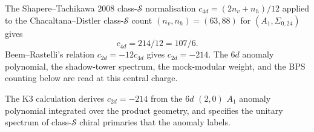 \begin{remark}
\label{rem:anomtop-class-s-central-charge-k3}
The Shapere--Tachikawa 2008 class-$\mathcal S$ normalisation
$c_{4d} = (2n_v + n_h)/12$ applied to the Chacaltana--Distler
class-$\mathcal S$ count $(n_v, n_h) = (63, 88)$ for
$(A_1, \Sigma_{0,24})$ gives
\[
c_{4d}=214/12=107/6.
\]
Beem--Rastelli's relation $c_{2d}=-12c_{4d}$ gives
$c_{2d}=-214$. The $6d$ anomaly polynomial, the shadow-tower
spectrum, the mock-modular weight, and the BPS counting below are
read at this central charge.
\end{remark}

The K3 calculation derives $c_{2d} = -214$ from the $6d$ $(2,0)$ $A_1$ anomaly
polynomial integrated over the product geometry, and specifies the
unitary spectrum of class-$\mathcal S$ chiral primaries that the
anomaly labels.

